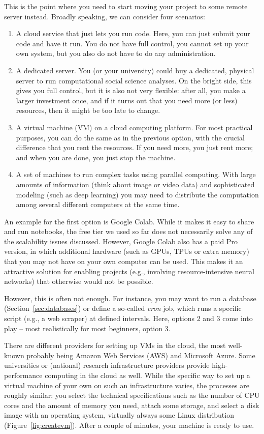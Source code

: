 This is the point where you need to start moving your project to some
remote server instead. Broadly speaking, we can consider four
scenarios:
\begin{enumerate}
\item A cloud service that just lets you run code. Here, you can just
  submit your code and have it run. You do not have full control, you
  cannot set up your own system, but you also do not have to do any
  administration.
\item A dedicated server. You (or your university) could buy a
  dedicated, physical server to run computational social science
  analyses. On the bright side, this gives you full control, but it is
  also not very flexible: after all, you make a larger investment
  once, and if it turns out that you need more (or less) resources,
  then it might be too late to change.
\item A virtual machine (VM) on a cloud computing platform. For most
  practical purposes, you can do the same as in the previous option,
  with the crucial difference that you rent the resources. If you need
  more, you just rent more; and when you are done, you just stop the
  machine.
\item A set of machines to run complex tasks using parallel computing. With large amounts of information (think about image or video data) and sophisticated modeling (such as deep learning) you may need to distribute the computation among several different computers at the same time.
\end{enumerate}

An example for the first option is Google Colab. While it makes it easy to share and run notebooks,
the free tier we used so far does not necessarily solve any of the
scalability issues discussed. However, Google Colab also has a paid Pro
version, in which additional hardware (such as GPUs, TPUs or extra memory)
that you may not have on your own computer can be used. This makes
it an attractive solution for enabling projects (e.g., involving
resource-intensive neural networks) that otherwise would not be possible.

However, this is often not enough. For instance, you may want to run
a database (Section~\ref{sec:databases}) or define a so-called \emph{cron} job,
which runs a specific script (e.g., a web scraper) at defined intervals.
Here, options 2 and 3 come into play -- most realistically for most
beginners, option 3.

There are different providers for setting up VMs in the cloud, the
most well-known probably being Amazon Web Services (AWS) and
Microsoft Azure. Some universities or (national) research infrastructure
providers provide high-performance computing in the cloud as well.
While the specific way to set up a virtual machine of your own on
such an infrastructure varies, the processes are roughly similar:
you select the technical specifications such as the number of CPU
cores and the amount of memory you need, attach some storage, and
select a disk image with an operating system, virtually always some
Linux distribution (Figure~\ref{fig:createvm}).
After a couple of minutes, your machine is ready to use.

